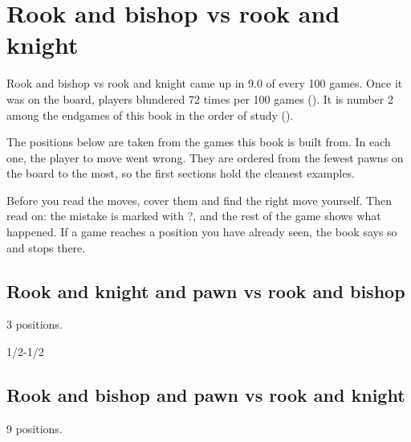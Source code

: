 \chapter{Rook and bishop vs rook and knight}\label{ch:rook-and-bishop-vs-rook-and-knight}
Rook and bishop vs rook and knight came up in 9.0 of every 100 games. Once it was on the board, players blundered 72 times per 100 games (). It is number 2 among the endgames of this book in the order of study ().

The positions below are taken from the games this book is built from. In each one, the player to move went wrong. They are ordered from the fewest pawns on the board to the most, so the first sections hold the cleanest examples.

Before you read the moves, cover them and find the right move yourself. Then read on: the mistake is marked with ?, and the rest of the game shows what happened. If a game reaches a position you have already seen, the book says so and stops there.


\section{Rook and knight and pawn vs rook and bishop}
3 positions.


1/2-1/2\par
\section{Rook and bishop and pawn vs rook and knight}
9 positions.

